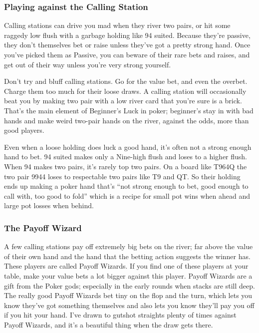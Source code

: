 \subsubsection{Playing against the Calling Station}

Calling stations can drive you mad when they river two pairs,
or hit some raggedy low flush with a garbage holding like 94 suited.
Because they're passive, they don't themselves bet or raise unless
they've got a pretty strong hand. Once you've picked them as
Passive, you can beware of their rare bets and raises, and get out of
their way unless you're very strong yourself.

Don't try and bluff calling stations. Go for the value bet,
and even the overbet. Charge them too much for their loose draws.
A calling station will occasionally beat you by making two pair with a
low river card that you're sure is a brick. That's the main element of
Beginner's Luck in poker; beginner's stay in with bad hands and make
weird two-pair hands on the river, against the odds, more than good
players.

Even when a loose holding does luck a good hand, it's often
not a strong enough hand to bet. 94 suited makes only a Nine-high
flush and loses to a higher flush. When 94 makes two pairs,
it's rarely top two pairs. On a board like T964Q the two pair 9944
loses to respectable two pairs like T9 and QT. So their
holding ends up making a poker hand that's ``not strong enough to bet,
good enough to call with, too good to fold'' which is a recipe for
small pot wins when ahead and large pot losses when behind.

\subsubsection{The Payoff Wizard}

A few calling stations pay off extremely big bets on the river; far
above the value of their own hand and the hand that the betting action
suggests the winner has. These players are called Payoff Wizards. If
you find one of these players at your table, make your value bets a
lot bigger against this player. Payoff Wizards are a gift from the
Poker gods; especially in the early rounds when stacks are still
deep. The really good Payoff Wizards bet tiny on the flop and the
turn, which lets you know they've got something themselves and also
lets you know they'll pay you off if you hit your hand. I've drawn to
gutshot straights plenty of times against Payoff Wizards, and it's a
beautiful thing when the draw gets there.

